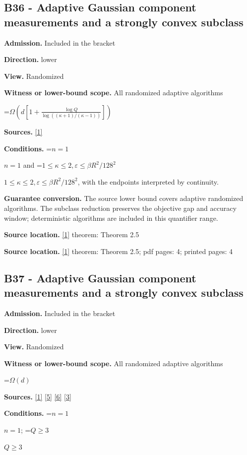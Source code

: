 \documentclass[10pt,a4paper]{article}
\newcommand{\AtlasMath}[1]{\par\begingroup\centering\setbox0=\hbox{$\displaystyle #1$}\ifdim\wd0>1.4\linewidth\typeout{ATLAS WIDE FORMULA: \the\wd0}\fi\ifdim\wd0>\linewidth\resizebox{\linewidth}{!}{\box0}\else\box0\fi\par\endgroup}
\newcommand{\AtlasInlineMath}[1]{\begingroup\setbox0=\hbox{$#1$}\ifdim\wd0>.4\linewidth\endgroup\AtlasMath{#1}\else\endgroup$#1$\fi}
\begin{document}
\subsection{B36 - Adaptive Gaussian component measurements and a strongly convex subclass}
\textbf{Admission.} Included in the bracket

\textbf{Direction.} lower

\textbf{View.} Randomized

\textbf{Witness or lower-bound scope.} All randomized adaptive algorithms

\AtlasMath{\Omega\!\left(d\left[1+\frac{\log Q}{\log((\kappa+1)/(\kappa-1))}\right]\right)}
\textbf{Sources.} \href{https://arxiv.org/html/2610.00345v1}{[1]}

\textbf{Conditions.} \AtlasInlineMath{n=1} and \AtlasInlineMath{1\le\kappa\le2,\varepsilon\le \beta R^2/128^2}, with the endpoints interpreted by continuity.

\textbf{Guarantee conversion.} The source lower bound covers adaptive randomized algorithms. The subclass reduction preserves the objective gap and accuracy window; deterministic algorithms are included in this quantifier range.

\textbf{Source location.} \href{https://arxiv.org/html/2610.00345v1}{[1]} theorem: Theorem 2.5

\textbf{Source location.} \href{https://arxiv.org/html/2610.00345v1}{[1]} theorem: Theorem 2.5; pdf pages: 4; printed pages: 4

\subsection{B37 - Adaptive Gaussian component measurements and a strongly convex subclass}
\textbf{Admission.} Included in the bracket

\textbf{Direction.} lower

\textbf{View.} Randomized

\textbf{Witness or lower-bound scope.} All randomized adaptive algorithms

\AtlasMath{\Omega(d)}
\textbf{Sources.} \href{https://arxiv.org/html/2610.00345v1}{[1]} \href{https://arxiv.org/html/2607.16558v2}{[5]} \href{https://www.mathnet.ru/php/archive.phtml?jrnid=mzm&option_lang=eng&paperid=1697&wshow=paper}{[6]} \href{https://arxiv.org/abs/2109.08858}{[3]}

\textbf{Conditions.} \AtlasInlineMath{n=1}; \AtlasInlineMath{Q\ge3}
\end{document}

